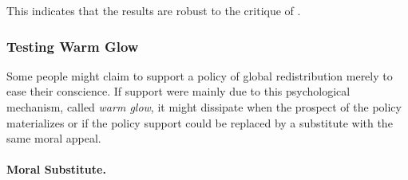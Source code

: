 \documentclass[12pt,english]{article}
\begin{document}
\begin{bibunit}
This indicates that the results are robust to the critique of \cite{de_la_cuesta_improving_2022}. 

\subsubsection{Testing Warm Glow}\label{subsec:warm_glow}

Some people might claim to support a policy of global redistribution merely to ease their conscience. If support were mainly due to this psychological mechanism, called \textit{warm glow}, it might
dissipate when the prospect of the policy materializes or if the policy support could be replaced by a substitute with the same moral appeal.

\paragraph{Moral Substitute.}


\end{bibunit}
\end{document}
